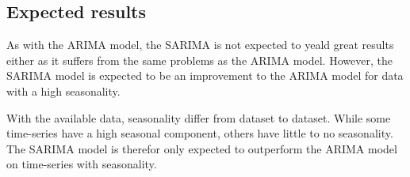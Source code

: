\subsection{Expected results}
As with the ARIMA model, the SARIMA is not expected to yeald great results either as it suffers from the same problems as the ARIMA model.
However, the SARIMA model is expected to be an improvement to the ARIMA model for data with a high seasonality.

With the available data, seasonality differ from dataset to dataset. While some time-series have a high seasonal component,
others have little to no seasonality.
The SARIMA model is therefor only expected to outperform the ARIMA model on time-series with seasonality.

\fi